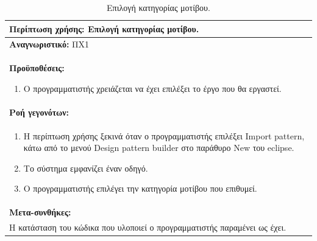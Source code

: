 \begin{table}[H]
	\hspace*{-0.2cm}
    \centering
    \scriptsize
	\begin{tabular}{|p{10cm}|}
		\hline
		\textbf{Περίπτωση χρήσης:} Επιλογή κατηγορίας μοτίβου.\\
		\hline
		\textbf{Αναγνωριστικό:} ΠΧ1\\
		\hline	
		\textbf{Προϋποθέσεις:}
		\begin{enumerate}
			\item Ο προγραμματιστής χρειάζεται να έχει επιλέξει το έργο που θα εργαστεί.
		\end{enumerate}\\
		\hline
		\textbf{Ροή γεγονότων:} \\ 
		\begin{enumerate}
			\item Η περίπτωση χρήσης ξεκινά όταν ο προγραμματιστής επιλέξει Import pattern, κάτω από το μενού Design pattern builder στο παράθυρο New του eclipse. 
			\item Το σύστημα εμφανίζει έναν οδηγό.
			\item Ο προγραμματιστής επιλέγει την κατηγορία μοτίβου που επιθυμεί.
		\end{enumerate}\\
		\hline
		\textbf{Μετα-συνθήκες:} \\ Η κατάσταση του κώδικα που υλοποιεί ο προγραμματιστής παραμένει ως έχει. \\
		\hline
    \end{tabular}
    \caption{Επιλογή κατηγορίας μοτίβου.}
    \label{tab:selectPatternCategoryUC}
\end{table}
